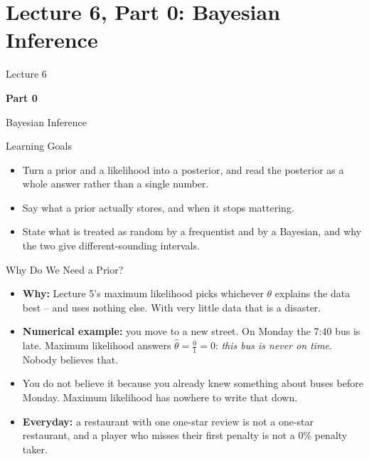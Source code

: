\section{Lecture 6, Part 0: Bayesian Inference}

\begin{frame}
\vfill
\centering
{\color{RLBlue}\large Lecture 6}

\vspace{0.3em}
{\color{RLBlue}\Large\bfseries Part 0}

\vspace{0.6em}
{\Large Bayesian Inference}
\vfill
\end{frame}

\begin{frame}{Learning Goals}
\begin{itemize}
  \item Turn a prior and a likelihood into a posterior, and read the posterior as a whole answer rather than a single number.
  \pause
  \item Say what a prior actually stores, and when it stops mattering.
  \pause
  \item State what is treated as random by a frequentist and by a Bayesian, and why the two give different-sounding intervals.
\end{itemize}
\end{frame}

\begin{frame}{Why Do We Need a Prior?}
\begin{itemize}
  \item \textbf{Why:} Lecture 5's maximum likelihood picks whichever $\theta$ explains the data best -- and uses nothing else. With very little data that is a disaster.
  \pause
  \item \textbf{Numerical example:} you move to a new street. On Monday the 7:40 bus is late. Maximum likelihood answers $\hat{\theta} = \tfrac{0}{1} = 0$: \emph{this bus is never on time}. Nobody believes that.
  \pause
  \item You do not believe it because you already knew something about buses before Monday. Maximum likelihood has nowhere to write that down.
  \pause
  \item \textbf{Everyday:} a restaurant with one one-star review is not a one-star restaurant, and a player who misses their first penalty is not a $0\%$ penalty taker.
\end{itemize}
\end{frame}


